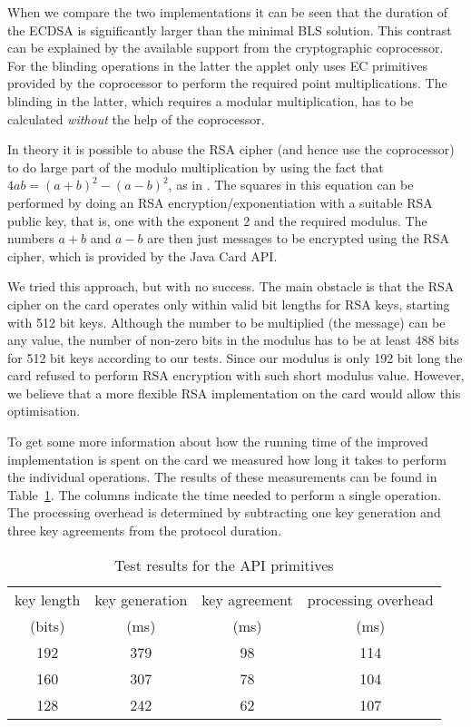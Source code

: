 When we compare the two implementations it can be seen that the duration of the
ECDSA is significantly larger than the minimal BLS solution. This contrast can
be explained by the available support from the cryptographic coprocessor. For
the blinding operations in the latter the applet only uses EC primitives
provided by the coprocessor to perform the required point multiplications. The
blinding in the latter, which requires a modular multiplication, has to be
calculated \emph{without} the help of the coprocessor.

In theory it is possible to abuse the RSA cipher (and hence use the coprocessor)
to do large part of the modulo multiplication by using the fact that
$4ab = (a+b)^2 - (a-b)^2$, as in \cite{Sterckx09,TewsJacobs09}. The squares in
this equation can be performed by doing an RSA encryption\slash exponentiation
with a suitable RSA public key, that is, one with the exponent 2 and the
required modulus. The numbers $a+b$ and $a-b$ are then just messages to be
encrypted using the RSA cipher, which is provided by the Java Card API.

We tried this approach, but with no success. The main obstacle is that the RSA
cipher on the card operates only within valid bit lengths for RSA keys, starting
with 512 bit keys. Although the number to be multiplied (the message) can be any
value, the number of non-zero bits in the modulus has to be at least 488 bits
for 512 bit keys according to our tests. Since our modulus is only 192 bit long
the card refused to perform RSA encryption with such short modulus value.
However, we believe that a more flexible RSA implementation on the card would
allow this optimisation.

To get some more information about how the running time of the improved
implementation is spent on the card we measured how long it takes to perform the
individual operations. The results of these measurements can be found in
Table~\ref{tab:primitives}. The columns indicate the time needed to perform a
single operation. The processing overhead is determined by subtracting one key
generation and three key agreements from the protocol duration.

\begin{table}
  \centering
  \caption{Test results for the API primitives}
  \label{tab:primitives}
  \renewcommand{\tabcolsep}{1.25mm}
  \renewcommand{\arraystretch}{1.25}
  \begin{tabular}{| c || c | c | c |}\hline
    key length & key generation & key agreement & processing overhead \\
    (bits) & (ms) & (ms) & (ms) \\\hline
    \hline
    192 & 379 & 98 & 114 \\\hline
    160 & 307 & 78 & 104 \\\hline
    128 & 242 & 62 & 107 \\\hline
  \end{tabular}
\end{table}

